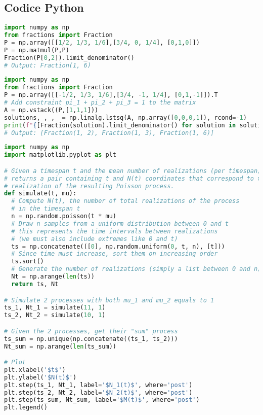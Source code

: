 \documentclass{homework}
\begin{document}
\newpage
\begin{appendices}
\section{Codice Python}

\begin{lstlisting}[language=Python, caption=Calcolo di $P^{(2)}_{1, 3}$]
import numpy as np
from fractions import Fraction
P = np.array([[1/2, 1/3, 1/6],[3/4, 0, 1/4], [0,1,0]])
P = np.matmul(P,P)
Fraction(P[0,2]).limit_denominator()
# Output: Fraction(1, 6)
\end{lstlisting}

\begin{lstlisting}[language=Python, caption=Calcolo della distribuzione stazionaria $\pi$]
import numpy as np
from fractions import Fraction
P = np.array([[-1/2, 1/3, 1/6],[3/4, -1, 1/4], [0,1,-1]]).T
# Add constraint pi_1 + pi_2 + pi_3 = 1 to the matrix
A = np.vstack((P,[1,1,1]))
solutions,_,_,_ = np.linalg.lstsq(A, np.array([0,0,0,1]), rcond=-1)
print(f"{[Fraction(solution).limit_denominator() for solution in solutions]}")
# Output: [Fraction(1, 2), Fraction(1, 3), Fraction(1, 6)]
\end{lstlisting}

\begin{lstlisting}[language=Python, caption=Simulazione dei processi di Poisson $N_1(t)$-$N_2(t)$-$M(t)$]
import numpy as np
import matplotlib.pyplot as plt

# Given a timespan t and the mean number of realizations (per timespan), 
# returns a pair containing t and N(t) coordinates that correspond to the 
# realization of the resulting Poisson process. 
def simulate(t, mu):
  # Compute N(t), the number of total realizations of the process
  # in the timespan t
  n = np.random.poisson(t * mu)
  # Draw n samples from a uniform distribution between 0 and t
  # this represents the time intervals between realizations
  # (we must also include extremes like 0 and t)
  ts = np.concatenate(([0], np.random.uniform(0, t, n), [t])) 
  # Since time must increase, sort them on increasing order
  ts.sort()
  # Generate the number of realizations (simply a list between 0 and n)
  Nt = np.arange(len(ts))
  return ts, Nt

# Simulate 2 processes with both mu_1 and mu_2 equals to 1
ts_1, Nt_1 = simulate(11, 1)
ts_2, Nt_2 = simulate(10, 1)

# Given the 2 processes, get their "sum" process 
ts_sum = np.unique(np.concatenate((ts_1, ts_2)))
Nt_sum = np.arange(len(ts_sum))

# Plot
plt.xlabel('$t$')
plt.ylabel('$N(t)$')
plt.step(ts_1, Nt_1, label='$N_1(t)$', where='post')
plt.step(ts_2, Nt_2, label='$N_2(t)$', where='post')
plt.step(ts_sum, Nt_sum, label='$M(t)$', where='post')
plt.legend()
\end{lstlisting}

\end{appendices}

\printbibliography
\end{document}
